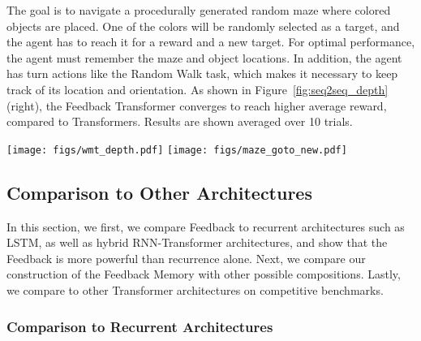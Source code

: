 \documentclass{article} \usepackage{iclr2021_conference}
\begin{document}
The goal is to navigate a procedurally generated random maze where colored objects are placed. 
One of the colors will be randomly selected as a target, and the agent has to reach it for a reward and a new target.
For optimal performance, the agent must remember the maze and object locations.
In addition, the agent has turn actions like the Random Walk task, which makes it necessary to keep track of its location and orientation.
As shown in Figure~\ref{fig:seq2seq_depth} (right), the Feedback Transformer converges to reach higher average reward, compared to Transformers. Results are shown averaged over 10 trials.  


\begin{figure*}
	\centering
	\texttt{[image: figs/wmt\_depth.pdf]}
	\hfill
	 \texttt{[image: figs/maze\_goto\_new.pdf]}
	\caption{\textbf{(left)} \textbf{Machine Translation on \texttt{WMT14 En-De},} test set BLEU and decoding speed in words-per-second for varying decoder depths. \textbf{(right) Maze Navigation in Gridworld.} We display average reward comparing Feedback Transformer to standard Transformers.}
	\label{fig:seq2seq_depth}
\end{figure*}



\subsection{Comparison to Other Architectures}

In this section, we first, we compare Feedback to recurrent architectures such as LSTM, as well as hybrid RNN-Transformer architectures, and show that the Feedback is more powerful than recurrence alone. Next, we compare our construction of the Feedback Memory with other possible compositions. Lastly, we compare to other Transformer architectures on competitive benchmarks.

\subsubsection{Comparison to Recurrent Architectures}
\end{document}
